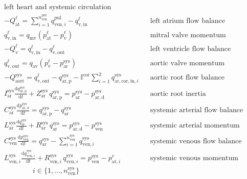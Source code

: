 \documentclass[a4paper,12pt]{report}
\begin{document}
\begin{equation}
\label{equation-syspul-1}
\begin{aligned}
&\text{left heart and systemic circulation} && \nonumber\\
&-Q_{\mathrm{at}}^{\ell} = \sum\limits_{i=1}^{n_{\mathrm{ven}}^{\mathrm{pul}}}q_{\mathrm{ven},i}^{\mathrm{pul}} - q_{\mathrm{v,in}}^{\ell} && \text{left atrium flow balance}\\
&q_{\mathrm{v,in}}^{\ell} = q_{\mathrm{mv}}(p_{\mathrm{at}}^{\ell}-p_{\mathrm{v}}^{\ell}) && \text{mitral valve momentum}\\
&-Q_{\mathrm{v}}^{\ell} = q_{\mathrm{v,in}}^{\ell} - q_{\mathrm{v,out}}^{\ell} && \text{left ventricle flow balance}\\
&q_{\mathrm{v,out}}^{\ell} = q_{\mathrm{av}}(p_{\mathrm{v}}^{\ell}-p_{\mathrm{ar}}^{\mathrm{sys}}) && \text{aortic valve momentum}\\
&-Q_{\mathrm{aort}}^{\mathrm{sys}} = q_{\mathrm{v,out}}^{\ell} - q_{\mathrm{ar,p}}^{\mathrm{sys}} - \mathbb{I}^{\mathrm{cor}}\sum\limits_{i=1}^{2}q_{\mathrm{ar,cor,in},i}^{\mathrm{sys}} && \text{aortic root flow balance}\\
&I_{\mathrm{ar}}^{\mathrm{sys}} \frac{\mathrm{d}q_{\mathrm{ar,p}}^{\mathrm{sys}}}{\mathrm{d}t} + Z_{\mathrm{ar}}^{\mathrm{sys}}\,q_{\mathrm{ar,p}}^{\mathrm{sys}}=p_{\mathrm{ar}}^{\mathrm{sys}}-p_{\mathrm{ar,d}}^{\mathrm{sys}} && \text{aortic root inertia}\nonumber\\
&C_{\mathrm{ar}}^{\mathrm{sys}} \frac{\mathrm{d}p_{\mathrm{ar,d}}^{\mathrm{sys}}}{\mathrm{d}t} = q_{\mathrm{ar,p}}^{\mathrm{sys}} - q_{\mathrm{ar}}^{\mathrm{sys}} && \text{systemic arterial flow balance}\\
&L_{\mathrm{ar}}^{\mathrm{sys}} \frac{\mathrm{d}q_{\mathrm{ar}}^{\mathrm{sys}}}{\mathrm{d}t} + R_{\mathrm{ar}}^{\mathrm{sys}}\,q_{\mathrm{ar}}^{\mathrm{sys}}=p_{\mathrm{ar,d}}^{\mathrm{sys}}-p_{\mathrm{ven}}^{\mathrm{sys}} && \text{systemic arterial momentum}\\
&C_{\mathrm{ven}}^{\mathrm{sys}} \frac{\mathrm{d}p_{\mathrm{ven}}^{\mathrm{sys}}}{\mathrm{d}t} = q_{\mathrm{ar}}^{\mathrm{sys}}-\sum\limits_{i=1}^{n_{\mathrm{ven}}^{\mathrm{sys}}}q_{\mathrm{ven},i}^{\mathrm{sys}}\ && \text{systemic venous flow balance}\\
&L_{\mathrm{ven},i}^{\mathrm{sys}} \frac{\mathrm{d}q_{\mathrm{ven},i}^{\mathrm{sys}}}{\mathrm{d}t} + R_{\mathrm{ven},i}^{\mathrm{sys}}\, q_{\mathrm{ven},i}^{\mathrm{sys}} = p_{\mathrm{ven}}^{\mathrm{sys}} - p_{\mathrm{at},i}^{r} && \text{systemic venous momentum}\nonumber\\
&\qquad\qquad i \in \{1,...,n_{\mathrm{ven}}^{\mathrm{sys}}\} && 
\end{aligned}
\end{equation}
\end{document}
